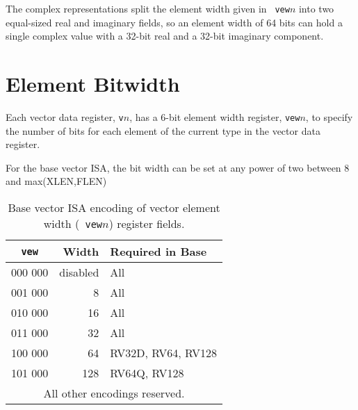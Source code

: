 \begin{commentary}
  The complex representations split the element width given in {\tt
    vew}$n$ into two equal-sized real and imaginary fields, so an
  element width of 64 bits can hold a single complex value with a
  32-bit real and a 32-bit imaginary component.
\end{commentary}

\clearpage

\section{Element Bitwidth}

Each vector data register, {\tt v}$n$, has a 6-bit element width
register, {\tt vew}$n$, to specify the number of bits for each element
of the current type in the vector data register.

For the base vector ISA, the bit width can be set at any power of two
between 8 and max(XLEN,FLEN)

\begin{table}[hbt]
  \centering
  \begin{tabular}{|c|r|l|}
    \hline
        {\tt vew} & Width & Required in Base \\
        \hline
        000 000 & disabled & All \\
        001 000 & 8 & All \\
        010 000 & 16 & All \\
        011 000 & 32 & All \\
        100 000 & 64 & RV32D, RV64, RV128\\
        101 000 & 128 & RV64Q, RV128\\
        \hline
        \multicolumn{3}{|c|}{All other encodings reserved.}\\
        \hline
  \end{tabular}
  \caption{Base vector ISA encoding of vector element width ({\tt
      vew}$n$) register fields.}
  \label{tab:basevew}
\end{table}

